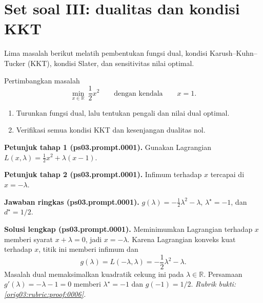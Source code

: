
\section{Set soal III: dualitas dan kondisi KKT}
\label{orig03:section:set-soal-dualitas-kkt}

Lima masalah berikut melatih pembentukan fungsi dual, kondisi
Karush--Kuhn--Tucker (KKT), kondisi Slater, dan sensitivitas nilai optimal.

\begin{exercise}
\label{orig03:ps03:problem:0001}
Pertimbangkan masalah
\[
 \min_{x\in\mathbb{R}}\ \frac12x^2
 \qquad\text{dengan kendala}\qquad x=1.
\]
\begin{enumerate}
\item\label{orig03:ps03:prompt:0001}
Turunkan fungsi dual, lalu tentukan pengali dan nilai dual optimal.
\item\label{orig03:ps03:prompt:0002}
Verifikasi semua kondisi KKT dan kesenjangan dualitas nol.
\end{enumerate}
\end{exercise}

\par\noindent\textbf{Petunjuk tahap 1 (ps03.prompt.0001).}
Gunakan Lagrangian $L(x,\lambda)=\tfrac12x^2+\lambda(x-1)$.
\label{orig03:ps03:hint1:0001}
\par\noindent\textbf{Petunjuk tahap 2 (ps03.prompt.0001).}
Infimum terhadap $x$ tercapai di $x=-\lambda$.
\label{orig03:ps03:hint2:0001}
\par\noindent\textbf{Jawaban ringkas (ps03.prompt.0001).}
$g(\lambda)=-\tfrac12\lambda^2-\lambda$,
$\lambda^\star=-1$, dan $d^\star=1/2$.
\label{orig03:ps03:answer:0001}
\par\noindent\textbf{Solusi lengkap (ps03.prompt.0001).}
Meminimumkan Lagrangian terhadap $x$ memberi syarat $x+\lambda=0$, jadi
$x=-\lambda$. Karena Lagrangian konveks kuat terhadap $x$, titik ini memberi
infimum dan
\[
 g(\lambda)=L(-\lambda,\lambda)
 =-\frac12\lambda^2-\lambda.
\]
Masalah dual memaksimalkan kuadratik cekung ini pada
$\lambda\in\mathbb{R}$. Persamaan $g'(\lambda)=-\lambda-1=0$ memberi
$\lambda^\star=-1$ dan $g(-1)=1/2$.
\emph{Rubrik bukti: \ref{orig03:rubric:proof:0006}.}
\label{orig03:ps03:solution:0001}

